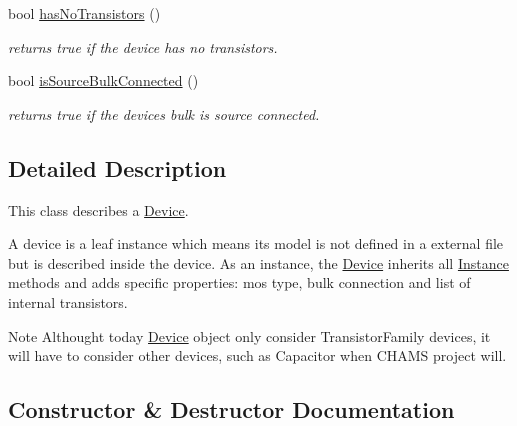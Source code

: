 \begin{DoxyCompactItemize}
bool \mbox{\hyperlink{class_open_chams_1_1_device_aa9d93f306256ac57b8bb8a4cb436c8d3}{has\+No\+Transistors}} ()
\begin{DoxyCompactList}\small\item\em returns true if the device has no transistors. \end{DoxyCompactList}\item 
\mbox{\label{class_open_chams_1_1_device_a29ed1982e1a8b3a634df8d0c70039669}} 
bool \mbox{\hyperlink{class_open_chams_1_1_device_a29ed1982e1a8b3a634df8d0c70039669}{is\+Source\+Bulk\+Connected}} ()
\begin{DoxyCompactList}\small\item\em returns true if the device\textquotesingle{}s bulk is source connected. \end{DoxyCompactList}\end{DoxyCompactItemize}


\subsection{Detailed Description}
This class describes a \mbox{\hyperlink{class_open_chams_1_1_device}{Device}}.

A device is a leaf instance which means its model is not defined in a external file but is described inside the device. As an instance, the \mbox{\hyperlink{class_open_chams_1_1_device}{Device}} inherits all \mbox{\hyperlink{class_open_chams_1_1_instance}{Instance}} methods and adds specific properties\+: mos type, bulk connection and list of internal transistors.

\begin{DoxyNote}{Note}
Althought today \mbox{\hyperlink{class_open_chams_1_1_device}{Device}} object only consider Transistor\+Family devices, it will have to consider other devices, such as Capacitor when C\+H\+A\+MS project will. 
\end{DoxyNote}


\subsection{Constructor \& Destructor Documentation}
\mbox{\label{class_open_chams_1_1_device_af5d1871d38a605955d7848d07df6d9a4}} 
